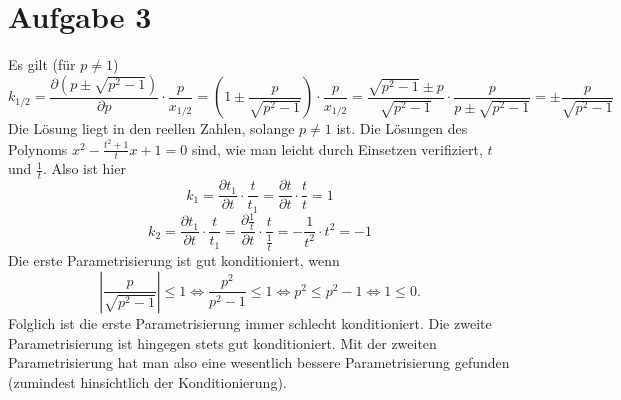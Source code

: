 \documentclass{article}
\theoremstyle{definition}
\newcommand{\equals}{\Longleftrightarrow}
\begin{document}
\section*{Aufgabe 3}
Es gilt (für $p \neq 1$)$$k_{1/2} = \frac{\partial (p \pm \sqrt{p^2 - 1})}{\partial p}\cdot \frac{p}{x_{1/2}} = \left(1 \pm \frac{p}{\sqrt{p^2-1}}\right)\cdot \frac{p}{x_{1/2}} = \frac{\sqrt{p^2 - 1} \pm p}{\sqrt{p^2 - 1}} \cdot \frac{p}{p \pm \sqrt{p^2 - 1}} = \pm \frac{p}{\sqrt{p^2-1}}$$
Die Lösung liegt in den reellen Zahlen, solange $p \neq 1$ ist.
Die Lösungen des Polynoms $x^2 - \frac{t^2 + 1}{t}x + 1 = 0$ sind, wie man leicht durch Einsetzen verifiziert, $t$ und $\frac{1}{t}$. Also ist hier
$$k_1 = \frac{\partial t_1}{\partial t} \cdot \frac{t}{t_1} = \frac{\partial t}{\partial t}\cdot \frac{t}{t} = 1$$
$$k_2 =  \frac{\partial t_1}{\partial t} \cdot \frac{t}{t_1} = \frac{\partial \frac{1}{t}}{\partial t}\cdot \frac{t}{\frac{1}{t}} = -\frac{1}{t^2} \cdot t^2 = -1$$
Die erste Parametrisierung ist gut konditioniert, wenn $$|\frac{p}{\sqrt{p^2-1}}| \leq 1 \equals \frac{p^2}{p^2-1} \leq 1 \equals p^2 \leq p^2 - 1 \equals 1 \leq 0.$$ Folglich ist die erste Parametrisierung immer schlecht konditioniert.
Die zweite Parametrisierung ist hingegen stets gut konditioniert. Mit der zweiten Parametrisierung hat man also eine wesentlich bessere Parametrisierung gefunden (zumindest hinsichtlich der Konditionierung).
\end{document}
